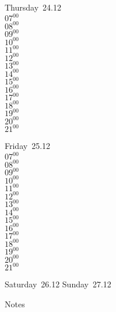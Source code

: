 \documentclass[11pt,a4paper]{book}\usepackage[]{graphicx}\usepackage[]{color}
\begin{document}
\clearpage
\begin{headerbox}
\end{headerbox}
\begin{weekdaybox}
  Thursday~24.12\\
  { 
  \vfill
  $07^{00}$\\
$08^{00}$\\
$09^{00}$\\
$10^{00}$\\
$11^{00}$\\
$12^{00}$\\
$13^{00}$\\
$14^{00}$\\
$15^{00}$\\
$16^{00}$\\
$17^{00}$\\
$18^{00}$\\
$19^{00}$\\
$20^{00}$\\
$21^{00}$\\
  }
\end{weekdaybox} 
\begin{weekdaybox}
  Friday~25.12\\
  { 
  \vfill
  $07^{00}$\\
$08^{00}$\\
$09^{00}$\\
$10^{00}$\\
$11^{00}$\\
$12^{00}$\\
$13^{00}$\\
$14^{00}$\\
$15^{00}$\\
$16^{00}$\\
$17^{00}$\\
$18^{00}$\\
$19^{00}$\\
$20^{00}$\\
$21^{00}$\\
  }
\end{weekdaybox}
\begin{weekendbox}
  Saturday~26.12
  \tcblower
  Sunday~27.12
\end{weekendbox} %
\begin{notebox}
  Notes
\end{notebox}
\clearpage
\end{document}
